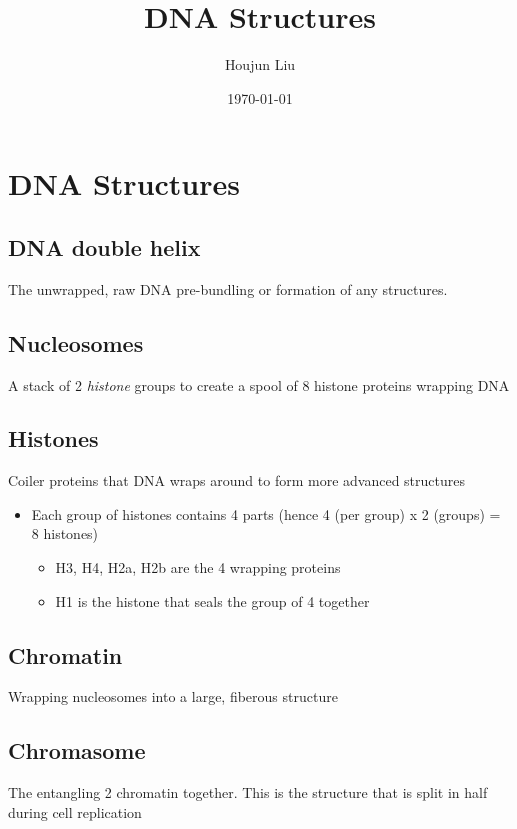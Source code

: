 \documentclass[letterpaper]{article}
\author{Houjun Liu}
\date{\today}
\title{DNA Structures}
\renewcommand\maketitle{}
\begin{document}
\maketitle


\section{DNA Structures}
\label{sec:org4c60323}
\subsection{DNA double helix}
\label{sec:orge7ba9ec}
The unwrapped, raw DNA pre-bundling or formation of any structures.

\subsection{Nucleosomes}
\label{sec:org2236438}
A stack of 2 \emph{histone} groups to create a spool of 8 histone proteins
wrapping DNA

\subsection{Histones}
\label{sec:org7315eb4}
Coiler proteins that DNA wraps around to form more advanced structures

\begin{itemize}
\item Each group of histones contains 4 parts (hence 4 (per group) x 2
(groups) = 8 histones)

\begin{itemize}
\item H3, H4, H2a, H2b are the 4 wrapping proteins
\item H1 is the histone that seals the group of 4 together
\end{itemize}
\end{itemize}

\subsection{Chromatin}
\label{sec:org51fe255}
Wrapping nucleosomes into a large, fiberous structure

\subsection{Chromasome}
\label{sec:org3441cd9}
The entangling 2 chromatin together. This is the structure that is split
in half during cell replication
\end{document}
